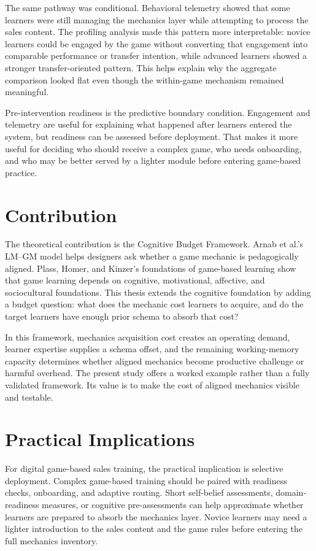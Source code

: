 \documentclass[12pt]{report}
\begin{document}
The same pathway was conditional. Behavioral telemetry showed that some learners were still managing the mechanics layer while attempting to process the sales content. The profiling analysis made this pattern more interpretable: novice learners could be engaged by the game without converting that engagement into comparable performance or transfer intention, while advanced learners showed a stronger transfer-oriented pattern. This helps explain why the aggregate comparison looked flat even though the within-game mechanism remained meaningful.

Pre-intervention readiness is the predictive boundary condition. Engagement and telemetry are useful for explaining what happened after learners entered the system, but readiness can be assessed before deployment. That makes it more useful for deciding who should receive a complex game, who needs onboarding, and who may be better served by a lighter module before entering game-based practice.

\section*{Contribution}
The theoretical contribution is the Cognitive Budget Framework. Arnab et al.'s LM--GM model helps designers ask whether a game mechanic is pedagogically aligned. Plass, Homer, and Kinzer's foundations of game-based learning show that game learning depends on cognitive, motivational, affective, and sociocultural foundations. This thesis extends the cognitive foundation by adding a budget question: what does the mechanic cost learners to acquire, and do the target learners have enough prior schema to absorb that cost?

In this framework, mechanics acquisition cost creates an operating demand, learner expertise supplies a schema offset, and the remaining working-memory capacity determines whether aligned mechanics become productive challenge or harmful overhead. The present study offers a worked example rather than a fully validated framework. Its value is to make the cost of aligned mechanics visible and testable.

\section*{Practical Implications}
For digital game-based sales training, the practical implication is selective deployment. Complex game-based training should be paired with readiness checks, onboarding, and adaptive routing. Short self-belief assessments, domain-readiness measures, or cognitive pre-assessments can help approximate whether learners are prepared to absorb the mechanics layer. Novice learners may need a lighter introduction to the sales content and the game rules before entering the full mechanics inventory.
\end{document}
